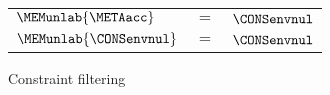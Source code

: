 \documentclass{jfp1}
\newcommand{\myfigure}{figure}
\newcommand{\sizeintables}{small}
\begin{document}
\begin{\myfigure}[t]
\begin{\sizeintables}
\begin{tabular}[t]{lll}
      $\MEMunlab{\METAacc}$
      & $=$
      & $\CONSenvnul$
      \\

      $\MEMunlab{\CONSenvnul}$
      & $=$
      & $\CONSenvnul$
    \end{tabular}



  \end{\sizeintables}
  \caption{Constraint filtering}
  \label{fig:csfiltering}
\end{\myfigure}
%
%
\end{document}
